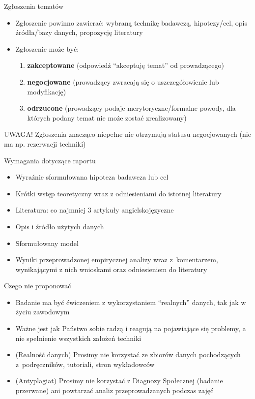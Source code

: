 \documentclass{beamer}
\begin{document}
\begin{frame}{Zgłoszenia tematów}
  \begin{itemize}
    \item Zgłoszenie powinno zawierać: wybraną technikę badawczą, hipotezy/cel,
      opis źródła/bazy danych, propozycję literatury
    \item Zgłoszenie może być:
      \begin{enumerate}
      \item \textbf{zakceptowane} (odpowiedź ``akceptuję temat'' od prowadzącego)
      \item \textbf{negocjowane} (prowadzący zwracają się o uszczegółowienie lub modyfikację)
      \item \textbf{odrzucone} (prowadzący podaje merytoryczne/formalne powody, dla których podany temat nie może zostać zrealizowany)
      \end{enumerate}
  \end{itemize}
   \begin{alert}{UWAGA!}
     Zgłoszenia znacząco niepełne nie otrzymują statusu negocjowanych (nie ma np. rezerwacji techniki)
   \end{alert}
\end{frame}

\begin{frame}{Wymagania dotyczące raportu}
  \begin{itemize}
  \item Wyraźnie sformułowana hipoteza badawcza lub cel
  \item Krótki wstęp teoretyczny wraz z odniesieniami do istotnej literatury
  \item Literatura: co najmniej 3 artykuły angielskojęzyczne
  \item Opis i źródło użytych danych
  \item Sformułowany model
  \item Wyniki przeprowadzonej empirycznej analizy wraz z~komentarzem, wynikającymi z nich wnioskami oraz odniesieniem do literatury
  \end{itemize}  
  \end{frame}

\begin{frame}{Czego nie proponować}
  \begin{itemize}
  \item Badanie ma być ćwiczeniem z wykorzystaniem ``realnych'' danych, tak jak w życiu zawodowym
  \item Ważne jest jak Państwo sobie radzą i reagują na pojawiające się problemy, a nie spełnienie wszystkich założeń techniki
  \item (Realność danych) Prosimy nie korzystać ze zbiorów danych pochodzących z~podręczników, tutoriali, stron wykładowców
  \item (Antyplagiat) Prosimy nie korzystać z Diagnozy Społecznej (badanie przerwane) ani powtarzać analiz przeprowadzanych podczas zajęć
  \end{itemize}
\end{frame}
\end{document}
